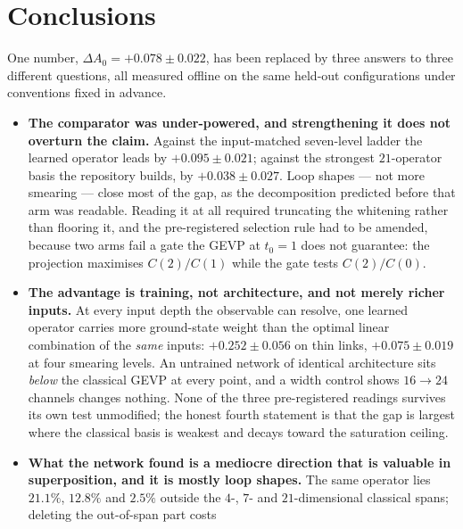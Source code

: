 \documentclass[11pt,a4paper]{article}
\newcommand{\dAzero}{\Delta A_0}
\begin{document}
\section{Conclusions}
\label{sec:conclusions}

One number, $\dAzero = +0.078 \pm 0.022$, has been replaced by three answers to
three different questions, all measured offline on the same held-out
configurations under conventions fixed in advance.

\begin{itemize}
  \item \textbf{The comparator was under-powered, and strengthening it does not
        overturn the claim.} Against the input-matched seven-level ladder the
        learned operator leads by $+0.095 \pm 0.021$; against the strongest
        $21$-operator basis the repository builds, by $+0.038 \pm 0.027$. Loop
        shapes --- not more smearing --- close most of the gap, as the
        decomposition predicted before that arm was readable. Reading it at all
        required truncating the whitening rather than flooring it, and the
        pre-registered selection rule had to be amended, because two arms fail a
        gate the GEVP at $t_0 = 1$ does not guarantee: the projection maximises
        $C(2)/C(1)$ while the gate tests $C(2)/C(0)$.
  \item \textbf{The advantage is training, not architecture, and not merely
        richer inputs.} At every input depth the observable can resolve, one
        learned operator carries more ground-state weight than the optimal
        linear combination of the \emph{same} inputs: $+0.252 \pm 0.056$ on thin
        links, $+0.075 \pm 0.019$ at four smearing levels. An untrained network
        of identical architecture sits \emph{below} the classical GEVP at every
        point, and a width control shows $16 \to 24$ channels changes nothing.
        None of the three pre-registered readings survives its own test
        unmodified; the honest fourth statement is that the gap is largest where
        the classical basis is weakest and decays toward the saturation
        ceiling.
  \item \textbf{What the network found is a mediocre direction that is valuable
        in superposition, and it is mostly loop shapes.} The same operator lies
        $21.1\%$, $12.8\%$ and $2.5\%$ outside the $4$-, $7$- and
        $21$-dimensional classical spans; deleting the out-of-span part costs

\end{itemize}
\end{document}
